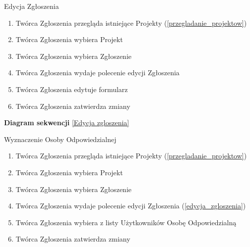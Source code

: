 \begin{usecase}{Edycja Zgłoszenia}
\label{edycja_zgloszenia}
	\begin{enumerate}
	\item Twórca Zgłoszenia przegląda istniejące Projekty (\ref{przegladanie_projektow})
    \item Twórca Zgłoszenia wybiera Projekt
    \item Twórca Zgłoszenia wybiera Zgłoszenie
    \item Twórca Zgłoszenia wydaje polecenie edycji Zgłoszenia
    \item Twórca Zgłoszenia edytuje formularz
    \item Twórca Zgłoszenia zatwierdza zmiany
	\end{enumerate}
	\parindent=0cm
	\textbf{Diagram sekwencji}
	\ref{Edycja zgloszenia}
\end{usecase}


\begin{usecase}{Wyznaczenie Osoby Odpowiedzialnej}
\label{wyznaczenie_osoby_odpowiedzialnej}
	\begin{enumerate}
    \item Twórca Zgłoszenia przegląda istniejące Projekty (\ref{przegladanie_projektow})
  	\item Twórca Zgłoszenia wybiera Projekt
  	\item Twórca Zgłoszenia wybiera Zgłoszenie
  	\item Twórca Zgłoszenia wydaje polecenie edycji Zgłoszenia (\ref{edycja_zgloszenia})
  	\item Twórca Zgłoszenia wybiera z listy Użytkowników Osobę Odpowiedzialną
  	\item Twórca Zgłoszenia zatwierdza zmiany
	\end{enumerate}
\end{usecase}


